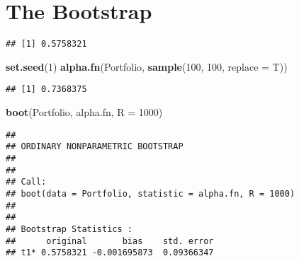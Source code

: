 \documentclass[
]{article}
\newenvironment{Shaded}{\begin{snugshade}}{\end{snugshade}}
\newcommand{\ControlFlowTok}[1]{\textcolor[rgb]{0.13,0.29,0.53}{\textbf{#1}}}
\newcommand{\DataTypeTok}[1]{\textcolor[rgb]{0.13,0.29,0.53}{#1}}
\newcommand{\DecValTok}[1]{\textcolor[rgb]{0.00,0.00,0.81}{#1}}
\newcommand{\KeywordTok}[1]{\textcolor[rgb]{0.13,0.29,0.53}{\textbf{#1}}}
\newcommand{\NormalTok}[1]{#1}
\newcommand{\OperatorTok}[1]{\textcolor[rgb]{0.81,0.36,0.00}{\textbf{#1}}}
\newcommand{\StringTok}[1]{\textcolor[rgb]{0.31,0.60,0.02}{#1}}
\begin{document}
\hypertarget{the-bootstrap}{%
\section{The Bootstrap}\label{the-bootstrap}}

\begin{Shaded}
\end{Shaded}

\begin{verbatim}
## [1] 0.5758321
\end{verbatim}

\begin{Shaded}
\begin{Highlighting}[]
\KeywordTok{set.seed}\NormalTok{(}\DecValTok{1}\NormalTok{)}
\KeywordTok{alpha.fn}\NormalTok{(Portfolio, }\KeywordTok{sample}\NormalTok{(}\DecValTok{100}\NormalTok{, }\DecValTok{100}\NormalTok{, }\DataTypeTok{replace =}\NormalTok{ T))}
\end{Highlighting}
\end{Shaded}

\begin{verbatim}
## [1] 0.7368375
\end{verbatim}

\begin{Shaded}
\begin{Highlighting}[]
\KeywordTok{boot}\NormalTok{(Portfolio, alpha.fn, }\DataTypeTok{R =} \DecValTok{1000}\NormalTok{)}
\end{Highlighting}
\end{Shaded}

\begin{verbatim}
## 
## ORDINARY NONPARAMETRIC BOOTSTRAP
## 
## 
## Call:
## boot(data = Portfolio, statistic = alpha.fn, R = 1000)
## 
## 
## Bootstrap Statistics :
##      original       bias    std. error
## t1* 0.5758321 -0.001695873  0.09366347
\end{verbatim}
\end{document}
